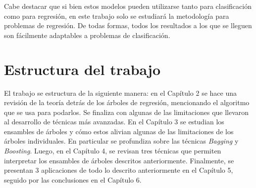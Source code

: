 Cabe destacar que si bien estos modelos pueden utilizarse tanto para clasificación como para regresión, en este trabajo solo se estudiará la metodología para problemas de regresión. De todas formas, todos los resultados a los que se lleguen son fácilmente adaptables a problemas de clasificación.

\section{Estructura del trabajo}

El trabajo se estructura de la siguiente manera: en el Capítulo 2 se hace una revisión de la teoría detrás de los árboles de regresión, mencionando el algoritmo que se usa para podarlos. Se finaliza con algunas de las limitaciones que llevaron al desarrollo de técnicas más avanzadas. En el Capítulo 3 se estudian los ensambles de árboles y cómo estos alivian algunas de las limitaciones de los árboles individuales. En particular se profundiza sobre las técnicas \textit{Bagging} y \textit{Boosting}. Luego, en el Capítulo 4, se revisan tres técnicas que permiten interpretar los ensambles de árboles descritos anteriormente. Finalmente, se presentan 3 aplicaciones de todo lo descrito anteriormente en el Capítulo 5, seguido por las conclusiones en el Capítulo 6.